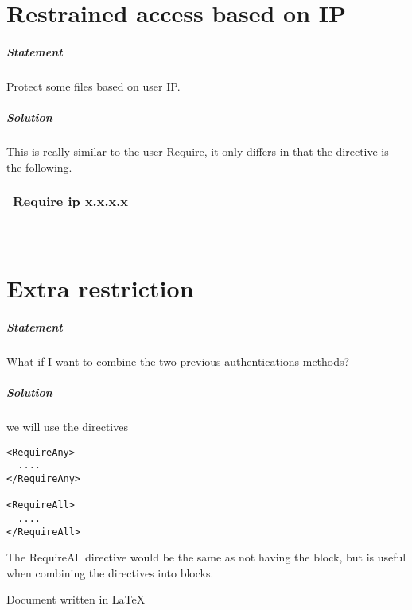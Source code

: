 \documentclass[a4paper,10pt]{article}
\begin{document}
\section{Restrained access based on IP}
\subparagraph{Statement}
Protect some files based on user IP.
\subparagraph{Solution}
This is really similar to the user Require, it only differs in that the directive is the following.
\vspace{0.5cm}\\\begin{tabular}{|l|}\hline
Require ip x.x.x.x
\\\hline\end{tabular}\vspace{0.5cm}\\

\section{Extra restriction}
\subparagraph{Statement}
What if I want to combine the two previous authentications methods?
\subparagraph{Solution}
we will use the directives
\begin{verbatim}
<RequireAny>
  ....
</RequireAny>

<RequireAll>
  ....
</RequireAll>
\end{verbatim}
The RequireAll directive would be the same as not having the block, but is useful when combining the directives into blocks.

\vspace*{\fill} %
\raggedleft Document written in \LaTeX{}
\end{document}
